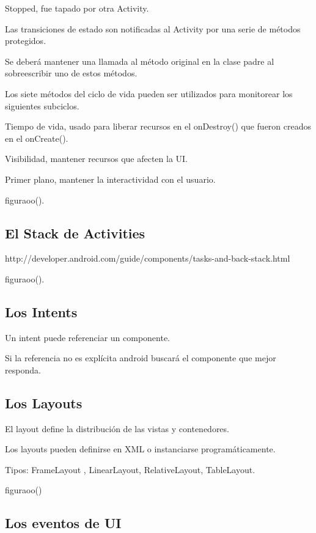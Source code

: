 Stopped, fue tapado por otra Activity.

Las transiciones de estado son notificadas al Activity por una serie de m\'etodos protegidos.

Se deber\'a mantener una llamada al m\'etodo original en la clase padre al sobreescribir uno de estos m\'etodos.

Los siete m\'etodos del ciclo de vida pueden ser utilizados para monitorear los siguientes subciclos.

Tiempo de vida, usado para liberar recursos en el onDestroy() que fueron creados en el onCreate().

Visibilidad, mantener recursos que afecten la UI.

Primer plano, mantener la interactividad con el usuario.

figuraoo().

\subsection{El Stack de Activities}
\label{subsec:dev.activity.stack}

http://developer.android.com/guide/components/tasks-and-back-stack.html

figuraoo().

\subsection{Los Intents}
\label{subsec:dev.intents}

Un intent puede referenciar un componente.

Si la referencia no es explícita android buscará el componente  que mejor responda.

\subsection{Los Layouts}
\label{subsec:dev.layouts}

El layout define la distribuci\'on de las vistas y contenedores.

Los layouts pueden definirse en XML o instanciarse program\'aticamente.

Tipos: FrameLayout , LinearLayout, RelativeLayout, TableLayout.

figuraoo()

\subsection{Los eventos de \ac{UI}}
\label{subsec:dev.ui.events}

